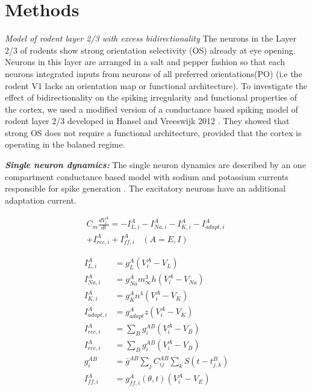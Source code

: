 \section{Methods}
\textit{Model of rodent layer 2/3 with excess bidirectionality}
The neurons in the Layer 2/3 of rodents show strong orientation selectivity (OS) already at eye opening. Neurons in this layer are arranged in a salt and pepper fashion so that each neurons integrated inputs from neurons of all preferred orientations(PO) (i.e the rodent V1 lacks an orientation map or functional architecture). To investigate the effect of bidirectionality on the spiking irregularity and functional properties of the cortex, we used a modified version of a conductance based spiking model of rodent layer 2/3 developed in Hansel and Vreeswijk 2012 \cite{Hansel2012}. They showed that strong OS does not require a functional architecture, provided that the cortex is operating in the balaned regime.

\textbf{\textit{Single neuron dynamics:}}
The single neuron dynamics are described by an one compartment conductance based model with sodium and potassium currents responsible for spike generation \cite{wang1996}. The excitatory neurons have an additional adaptation current.

\begin{equation}
\begin{split}
C_{m} \frac{dV_{i}^{A}}{dt} = -I_{L, i}^{A} -I_{Na, i}^{A}-I_{K, i}^{A} -I_{adapt, i}^{A}\  \\ + I_{rec, i}^{A} + I_{ff, i}^{A} \,\,\;\; (A = E, I) 
\end{split}
\end{equation}

\begin{align}
I_{L, i}^{A} &= g_{L}^{A} (V_{i}^{A} - V_{L}) \\
I_{Na, i}^{A} &= g_{Na}^{A} m_{\infty}^{3} h (V_{i}^{A} - V_{Na}) \\
I_{K, i}^{A} &= g_{K}^{A} n^{4} (V_{i}^{A} - V_{K}) \\
I_{adapt, i}^{A} &= g_{adapt}^{A} z (V_{i}^{A} - V_{K}) \\
I_{rec, i}^{A} &= \sum_{B} g_{i}^{AB} (V_{i}^{A} - V_{B}) \\
I_{rec, i}^{A} &= \sum_{B} g_{i}^{AB} (V_{i}^{A} - V_{B}) \\
g_{i}^{AB} &= \bar{g}^{AB} \sum_{j} C^{AB}_{ij} \sum_{k} S(t - t^{B}_{j, k}) \\
I_{ff, i}^{A} &= g_{ff, i}^{A} (\theta, t) (V_{i}^{A} - V_{E})
\end{align}

